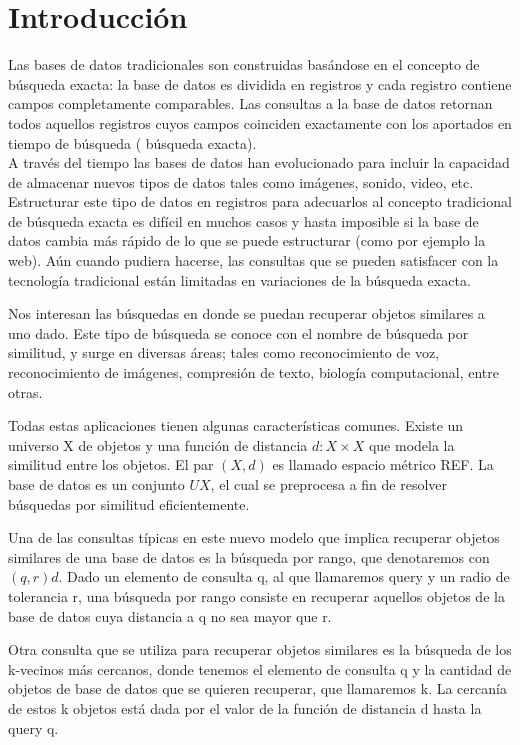 \chapter{Introducci\'on}
\label{chap:intro}

Las bases de datos tradicionales son construidas bas\'andose en el concepto de b\'usqueda exacta: la base de datos es dividida en registros y cada registro contiene campos completamente comparables. Las consultas a la base de datos retornan todos aquellos registros cuyos campos coinciden exactamente con los aportados en tiempo de b\'usqueda ( b\'usqueda exacta).\\
				
A trav\'es del tiempo las bases de datos han evolucionado para incluir la capacidad de almacenar nuevos tipos de datos tales como im\'agenes, sonido, video, etc. Estructurar este tipo de datos en registros para adecuarlos al concepto tradicional de b\'usqueda exacta es dif\'icil en muchos casos y hasta imposible si la base de datos cambia m\'as r\'apido de lo que se puede estructurar (como por ejemplo la web). A\'un cuando pudiera hacerse, las consultas que se pueden satisfacer con la tecnolog\'ia tradicional est\'an limitadas en variaciones de la b\'usqueda exacta.
					
Nos interesan las b\'usquedas en donde se puedan recuperar objetos similares a uno dado. Este tipo de b\'usqueda se conoce con el nombre de b\'usqueda por similitud, y surge en diversas \'areas; tales como reconocimiento de voz, reconocimiento de im\'agenes, compresi\'on de texto, biolog\'ia computacional, entre otras.
					
Todas estas aplicaciones tienen algunas caracter\'isticas comunes. Existe un universo X de objetos y una funci\'on de distancia $d: X \times X$ que modela la similitud entre los objetos. El par $(X, d)$ es llamado espacio m\'etrico REF. La base de datos es un conjunto $UX$, el cual se preprocesa a fin de resolver b\'usquedas por similitud eficientemente.
					
Una de las consultas t\'ipicas en este nuevo modelo que implica recuperar objetos similares de una base de datos es la b\'usqueda por rango, que denotaremos con $(q, r)d$. Dado un elemento de consulta q, al que llamaremos query y un radio de tolerancia r, una b\'usqueda por rango consiste en recuperar aquellos objetos de la base de datos cuya distancia a q no sea mayor que r.

Otra consulta que se utiliza para recuperar objetos similares es la b\'usqueda de los k-vecinos m\'as cercanos, donde tenemos el elemento de consulta q y la cantidad de objetos de base de datos que se quieren recuperar, que llamaremos k. La cercan\'ia de estos k objetos est\'a dada por el valor de la funci\'on de distancia d hasta la query q.
				
